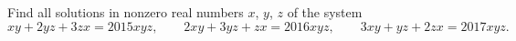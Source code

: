 Find all solutions in nonzero real numbers $x$, $y$, $z$ of the system
\[
xy+2yz+3zx=2015xyz,\qquad 2xy+3yz+zx=2016xyz,\qquad 3xy+yz+2zx=2017xyz .
\]
